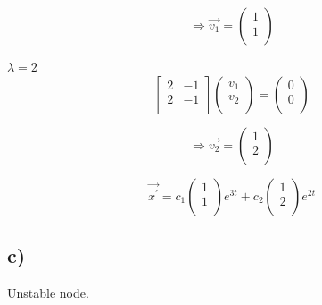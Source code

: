 \documentclass[12pt]{article}
\begin{document}
\begin{displaymath}
  \Rightarrow\vec{v_1} = 
  \left(
  \begin{array}{c}
    1\\
    1\\
  \end{array}
    \right)
\end{displaymath}

\(\lambda = 2\)
\begin{displaymath}
  \left[
    \begin{array}{cc}
      2 & -1\\
      2 & -1\\
    \end{array}
    \right]
  \left(
  \begin{array}{c}
    v_1\\
    v_2\\
  \end{array}
  \right)
  =
  \left(
  \begin{array}{c}
    0\\
    0\\
  \end{array}
  \right)
\end{displaymath}

\begin{displaymath}
  \Rightarrow\vec{v_2} = 
  \left(
  \begin{array}{c}
    1\\
    2\\
  \end{array}
    \right)
\end{displaymath}

\begin{displaymath}
  \vec{x^{'}} = 
  c_1
  \left(
  \begin{array}{c}
    1\\
    1\\
  \end{array}
  \right)
  e^{3t}
  + c_2
  \left(
  \begin{array}{c}
    1\\
    2\\
  \end{array}
  \right)
  e^{2t}
\end{displaymath}

\subsection*{c)}
Unstable node.
\end{document}
